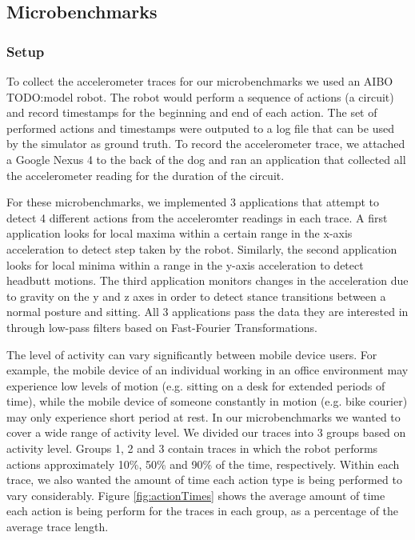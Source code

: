 \subsection{Microbenchmarks}

\subsubsection{Setup}
To collect the accelerometer traces for our microbenchmarks we used an AIBO TODO:model robot. The robot would perform a sequence of actions (a circuit) and record timestamps for the beginning and end of each action. The set of performed actions and timestamps were outputed to a log file that can be used by the simulator as ground truth. To record the accelerometer trace, we attached a Google Nexus 4 to the back of the dog and ran an application that collected all the accelerometer reading for the duration of the circuit.

For these microbenchmarks, we implemented 3 applications that attempt to detect 4 different actions from the acceleromter readings in each trace. A first application looks for local maxima within a certain range in the x-axis acceleration to detect step taken by the robot. Similarly, the second application looks for local minima within a range in the y-axis acceleration to detect headbutt motions. The third application monitors changes in the acceleration due to gravity on the y and z axes in order to detect stance transitions between a normal posture and sitting. All 3 applications pass the data they are interested in through low-pass filters based on Fast-Fourier Transformations.

The level of activity can vary significantly between mobile device users. For example, the mobile device of an individual working in an office environment may experience low levels of motion (e.g. sitting on a desk for extended periods of time), while the mobile device of someone constantly in motion (e.g. bike courier) may only experience short period at rest. In our microbenchmarks we wanted to cover a wide range of activity level. We divided our traces into 3 groups based on activity level. Groups 1, 2 and 3 contain traces in which the robot performs actions approximately 10\%, 50\% and 90\% of the time, respectively. Within each trace, we also wanted the amount of time each action type is being performed to vary considerably. Figure \ref{fig:actionTimes} shows the average amount of time each action is being perform for the traces in each group, as a percentage of the average trace length. 

